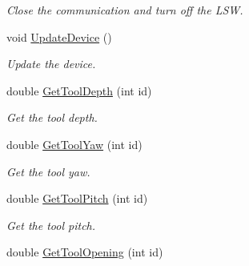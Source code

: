 \begin{DoxyCompactItemize}
\begin{DoxyCompactList}\small\item\em Close the communication and turn off the LSW. \item\end{DoxyCompactList}\item 
\hypertarget{classvtkLSW_a9e4792570b3b6389fa63578b4de108af}{
void \hyperlink{classvtkLSW_a9e4792570b3b6389fa63578b4de108af}{UpdateDevice} ()}
\label{classvtkLSW_a9e4792570b3b6389fa63578b4de108af}

\begin{DoxyCompactList}\small\item\em Update the device. \item\end{DoxyCompactList}\item 
\hypertarget{classvtkLSW_aecc6d74af302a2f38f035d0505a814b7}{
double \hyperlink{classvtkLSW_aecc6d74af302a2f38f035d0505a814b7}{GetToolDepth} (int id)}
\label{classvtkLSW_aecc6d74af302a2f38f035d0505a814b7}

\begin{DoxyCompactList}\small\item\em Get the tool depth. \item\end{DoxyCompactList}\item 
\hypertarget{classvtkLSW_a5249eee6cc3f300c7e9837ae25324bdb}{
double \hyperlink{classvtkLSW_a5249eee6cc3f300c7e9837ae25324bdb}{GetToolYaw} (int id)}
\label{classvtkLSW_a5249eee6cc3f300c7e9837ae25324bdb}

\begin{DoxyCompactList}\small\item\em Get the tool yaw. \item\end{DoxyCompactList}\item 
\hypertarget{classvtkLSW_a5412bdbbc4c5526f9b7d5bd7c73725ac}{
double \hyperlink{classvtkLSW_a5412bdbbc4c5526f9b7d5bd7c73725ac}{GetToolPitch} (int id)}
\label{classvtkLSW_a5412bdbbc4c5526f9b7d5bd7c73725ac}

\begin{DoxyCompactList}\small\item\em Get the tool pitch. \item\end{DoxyCompactList}\item 
\hypertarget{classvtkLSW_a85ab5beed649a1c387bc8639a46db218}{
double \hyperlink{classvtkLSW_a85ab5beed649a1c387bc8639a46db218}{GetToolOpening} (int id)}
\label{classvtkLSW_a85ab5beed649a1c387bc8639a46db218}


\end{DoxyCompactItemize}
